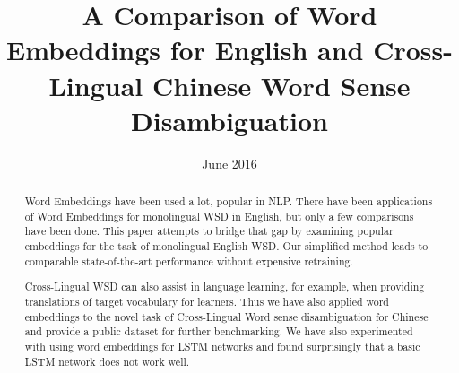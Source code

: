 \documentclass[11pt]{article}
\title{A Comparison of Word Embeddings for English and Cross-Lingual Chinese Word Sense Disambiguation}
\date{June 2016}
\begin{document}
\maketitle
  

\begin{abstract}
Word Embeddings have been used a lot, popular in NLP. 
There have been applications of Word Embeddings for monolingual WSD in English, but only a few comparisons have been done.
This paper attempts to bridge that gap by examining popular embeddings for the task of monolingual English WSD. 
Our simplified method leads to comparable state-of-the-art performance without expensive retraining. 


Cross-Lingual WSD can also assist in language learning, for example, when providing translations of target vocabulary for learners. 
Thus we have also applied word embeddings to the novel task of Cross-Lingual Word sense disambiguation for Chinese and provide a public dataset for further benchmarking.
We have also experimented with using word embeddings for LSTM networks and found surprisingly that a basic LSTM network does not work well.


\end{abstract}
\end{document}
